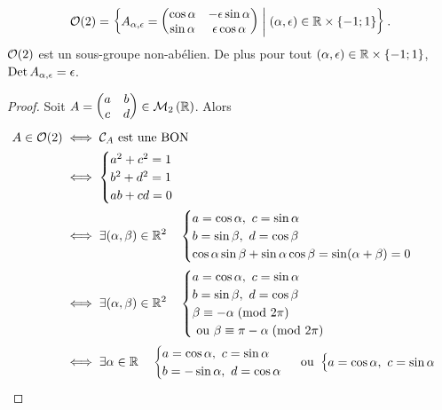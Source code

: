 \begin{theo}
  \begin{equation}
    \mathcal{O}\!\left(2\right) = \left\{A_{\alpha, \epsilon}=\begin{pmatrix} \cos \alpha & 
      -\epsilon\sin\alpha \\ \sin\alpha & 
    \epsilon\cos\alpha\end{pmatrix}\mathrel{}\middle|\mathrel{}(\alpha, \epsilon)\in \mathbb{R}\times\{-1; 
    1\}\right\}.
  \end{equation}
  \(\mathcal{O}\!\left(2\right)\) est un sous-groupe non-abélien. De plus pour tout \((\alpha, 
  \epsilon)\in \mathbb{R}\times\{-1; 1\}\), \(\operatorname{Det} A_{\alpha, \epsilon} = 
  \epsilon\).
\end{theo}
\begin{proof}
  Soit \(A=\begin{pmatrix} a & b \\ c & d \end{pmatrix} \in \mathcal{M}_{2}\left(\mathbb{R}\right)\). 
    Alors
    \begin{align*}
      A \in \Orth{2} &\iff \courbe_A \text{~est une BON} \\
      &\iff \begin{cases} a^2+c^2=1 \\ b^2+d^2=1 \\ ab+cd=0 \end{cases}\\
        &\iff \exists (\alpha, \beta) \in \R^2 \quad \begin{cases} 
          a=\cos\alpha, \ c=\sin\alpha \\ b=\sin\beta, \ d=\cos\beta \\ 
          \cos\alpha\sin\beta+\sin\alpha\cos\beta=\sin(\alpha+\beta)=0 
        \end{cases}\\
        &\iff \exists (\alpha, \beta) \in \R^2 \quad \begin{cases} 
          a=\cos\alpha, \ c=\sin\alpha \\ b=\sin\beta, \ d=\cos\beta \\ 
          \congru{\beta}{-\alpha}{2\pi} \\ \text{~ou~} 
        \congru{\beta}{\pi-\alpha}{2\pi} \end{cases}\\
        &\iff \exists \alpha \in \R \quad \begin{cases} a=\cos\alpha, \ 
        c=\sin\alpha \\ b=-\sin\alpha, \ d=\cos\alpha \end{cases} 
        \text{~ou~} \begin{cases} a=\cos\alpha, \ c=\sin\alpha \\ 

\end{cases}
\end{align*}
\end{proof}
